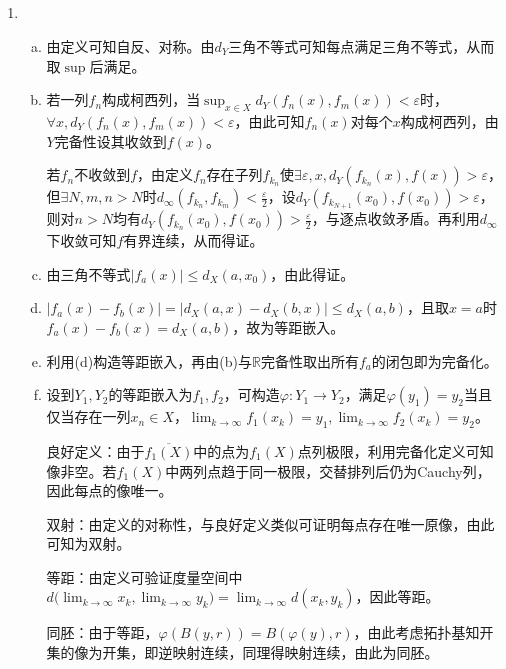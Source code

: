\documentclass[a4paper,UTF8,fontset=windows]{ctexart}
\begin{document}
\subsection{}
\begin{enumerate}[(1)]
    \item
    \begin{enumerate}[(a)]
    \item
    由定义可知自反、对称。由$d_Y$三角不等式可知每点满足三角不等式，从而取$\sup$后满足。
    
    \item
    若一列$f_n$构成柯西列，当$\sup_{x\in X}d_Y(f_n(x),f_m(x))<\varepsilon$时，$\forall x,d_Y(f_n(x),f_m(x))<\varepsilon$，由此可知$f_n(x)$对每个$x$构成柯西列，由$Y$完备性设其收敛到$f(x)$。
    
    若$f_n$不收敛到$f$，由定义$f_n$存在子列$f_{k_n}$使$\exists\varepsilon,x,d_Y(f_{k_n}(x),f(x))>\varepsilon$，但$\exists N,m,n>N$时$d_\infty(f_{k_n},f_{k_m})<\frac{\varepsilon}{2}$，设$d_Y(f_{k_{N+1}}(x_0),f(x_0))>\varepsilon$，则对$n>N$均有$d_Y(f_{k_n}(x_0),f(x_0))>\frac{\varepsilon}{2}$，与逐点收敛矛盾。再利用$d_\infty$下收敛可知$f$有界连续，从而得证。
    
    \item
    由三角不等式$|f_a(x)|\le d_X(a,x_0)$，由此得证。
    
    \item
    $|f_a(x)-f_b(x)|=|d_X(a,x)-d_X(b,x)|\le d_X(a,b)$，且取$x=a$时$f_a(x)-f_b(x)=d_X(a,b)$，故为等距嵌入。
    
    \item
    利用(d)构造等距嵌入，再由(b)与$\mathbb{R}$完备性取出所有$f_a$的闭包即为完备化。
    
    \item
    设到$Y_1,Y_2$的等距嵌入为$f_1,f_2$，可构造$\varphi:Y_1\to Y_2$，满足$\varphi(y_1)=y_2$当且仅当存在一列$x_n\in X$，$\lim_{k\to\infty}f_1(x_k)=y_1,\lim_{k\to\infty}f_2(x_k)=y_2$。
    
    良好定义：由于$\overline{f_1(X)}$中的点为$f_1(X)$点列极限，利用完备化定义可知像非空。若$f_1(X)$中两列点趋于同一极限，交替排列后仍为Cauchy列，因此每点的像唯一。
    
    双射：由定义的对称性，与良好定义类似可证明每点存在唯一原像，由此可知为双射。
    
    等距：由定义可验证度量空间中$d\big(\lim_{k\to\infty}x_k,\lim_{k\to\infty}y_k\big)=\lim_{k\to\infty}d(x_k,y_k)$，因此等距。
    
    同胚：由于等距，$\varphi(B(y,r))=B(\varphi(y),r)$，由此考虑拓扑基知开集的像为开集，即逆映射连续，同理得映射连续，由此为同胚。
    \end{enumerate}
    

\end{enumerate}
\end{document}
